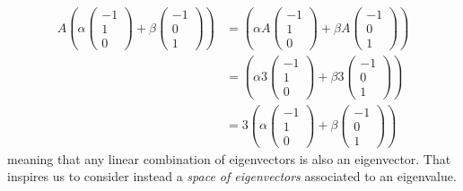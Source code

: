 \begin{align*}
A \left( \alpha \begin{pmatrix} -1 \\ 1 \\ 0 \end{pmatrix} +
\beta \begin{pmatrix} -1 \\ 0 \\ 1 \end{pmatrix} \right) &= \left( \alpha A\begin{pmatrix} -1 \\ 1 \\ 0 \end{pmatrix} +
\beta A\begin{pmatrix} -1 \\ 0 \\ 1 \end{pmatrix} \right) \\ 
&= \left( \alpha 3\begin{pmatrix} -1 \\ 1 \\ 0 \end{pmatrix} +
\beta 3\begin{pmatrix} -1 \\ 0 \\ 1 \end{pmatrix} \right) \\
&= 3\left( \alpha \begin{pmatrix} -1 \\ 1 \\ 0 \end{pmatrix} +
\beta \begin{pmatrix} -1 \\ 0 \\ 1 \end{pmatrix} \right)
\end{align*}
meaning that any linear combination of eigenvectors is also an eigenvector. That inspires us to consider instead a \textit{space of eigenvectors} associated to an eigenvalue.

